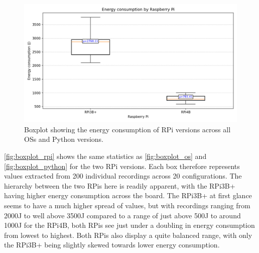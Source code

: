 \begin{figure}[H]
    \centering
    \includegraphics[width=\textwidth]{figures/energy_boxplot_by_rpi.png}
    \caption{Boxplot showing the energy consumption of RPi versions across all OSs and Python versions.}
    \label{fig:boxplot_rpi}
\end{figure}

\autoref{fig:boxplot_rpi} shows the same statistics as \autoref{fig:boxplot_os} and \autoref{fig:boxplot_python} for the two RPi versions. Each box therefore represents values extracted from 200 individual recordings across 20 configurations. The hierarchy between the two RPis here is readily apparent, with the RPi3B+ having higher energy consumption across the board. The RPi3B+ at first glance seems to have a much higher spread of values, but with recordings ranging from 2000J to well above 3500J compared to a range of just above 500J to around 1000J for the RPi4B, both RPis see just under a doubling in energy consumption from lowest to highest. Both RPis also display a quite balanced range, with only the RPi3B+ being slightly skewed towards lower energy consumption.
